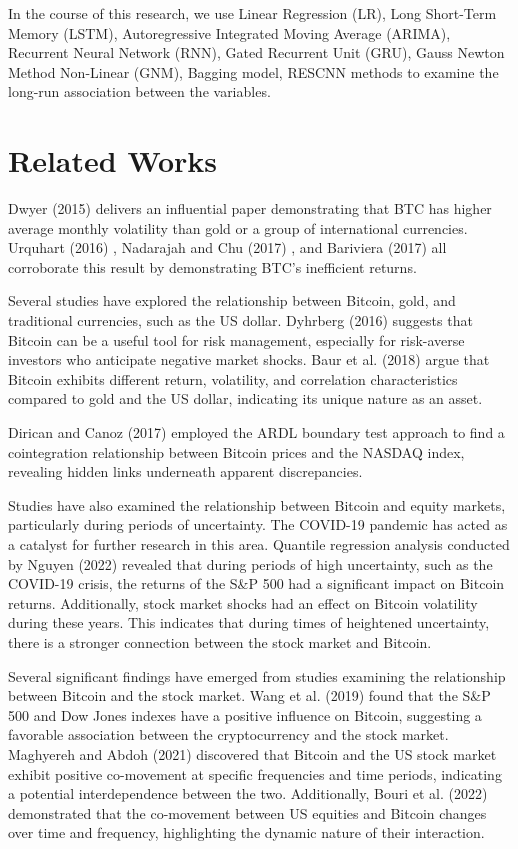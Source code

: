 \documentclass{ieeeojies}
\begin{document}
In the course of this research, we use  Linear Regression (LR), Long Short-Term Memory (LSTM), Autoregressive Integrated Moving Average (ARIMA), Recurrent Neural Network (RNN), Gated Recurrent Unit (GRU), Gauss Newton Method Non-Linear (GNM), Bagging model, RESCNN methods to examine the long-run association between the variables.

\section{Related Works}
Dwyer (2015) \cite{b1} delivers an influential paper demonstrating that BTC has higher average monthly volatility than gold or a group of international currencies. Urquhart (2016) \cite{b2}, Nadarajah and Chu (2017) \cite{b3}, and Bariviera (2017) \cite{b4} all corroborate this result by demonstrating BTC’s inefficient returns. 

Several studies have explored the relationship between Bitcoin, gold, and traditional currencies, such as the US dollar. Dyhrberg (2016) \cite{b5} suggests that Bitcoin can be a useful tool for risk management, especially for risk-averse investors who anticipate negative market shocks. Baur et al. (2018) \cite{b6} argue that Bitcoin exhibits different return, volatility, and correlation characteristics compared to gold and the US dollar, indicating its unique nature as an asset.

Dirican and Canoz (2017) \cite{b7} employed the ARDL boundary test approach to find a cointegration relationship between Bitcoin prices and the NASDAQ index, revealing hidden links underneath apparent discrepancies.

Studies have also examined the relationship between Bitcoin and equity markets, particularly during periods of uncertainty. The COVID-19 pandemic has acted as a catalyst for further research in this area. Quantile regression analysis conducted by Nguyen (2022) \cite{b8} revealed that during periods of high uncertainty, such as the COVID-19 crisis, the returns of the S\&P 500 had a significant impact on Bitcoin returns. Additionally, stock market shocks had an effect on Bitcoin volatility during these years. This indicates that during times of heightened uncertainty, there is a stronger connection between the stock market and Bitcoin.

Several significant findings have emerged from studies examining the relationship between Bitcoin and the stock market. Wang et al. (2019) \cite{b9} found that the S\&P 500 and Dow Jones indexes have a positive influence on Bitcoin, suggesting a favorable association between the cryptocurrency and the stock market. Maghyereh and Abdoh (2021) \cite{b10} discovered that Bitcoin and the US stock market exhibit positive co-movement at specific frequencies and time periods, indicating a potential interdependence between the two. Additionally, Bouri et al. (2022) \cite{b11} demonstrated that the co-movement between US equities and Bitcoin changes over time and frequency, highlighting the dynamic nature of their interaction.
\end{document}
